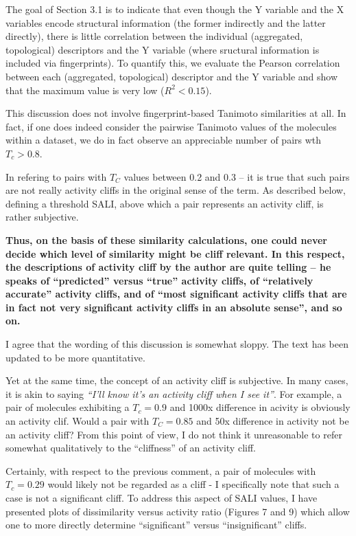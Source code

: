 \documentclass[letterpaper, 12pt]{article}
\begin{document}
The goal of Section 3.1 is to indicate that even though the Y variable and the X variables encode
structural information (the former indirectly and the latter directly), there is little correlation
between the individual (aggregated, topological) descriptors and the Y variable (where sructural
information is included via fingerprints). To quantify this, we evaluate the Pearson correlation
between each (aggregated, topological) descriptor and the Y variable and show that the maximum value
is very low ($R^2 < 0.15$).

This discussion does not involve fingerprint-based Tanimoto similarities at all. In fact, if one
does indeed consider the pairwise Tanimoto values of the molecules within a dataset, we do in fact
observe an appreciable number of pairs wth $T_c > 0.8$.

In refering to pairs with $T_C$ values between 0.2 and 0.3 -- it is true that such pairs are not
really activity cliffs in the original sense of the term. As described below, defining a threshold
SALI, above which a pair represents an activity cliff, is rather subjective. 

\textbf{Thus, on the basis of these similarity calculations, one could never decide which level of
  similarity might be cliff relevant. In this respect, the descriptions of activity cliff by the
  author are quite telling – he speaks of “predicted” versus “true” activity cliffs, of “relatively
  accurate” activity cliffs, and of “most significant activity cliffs that are in fact not very
  significant activity cliffs in an absolute sense”, and so on. }

I agree that the wording of this discussion is somewhat sloppy. The text has been updated to be more
quantitative.

Yet at the same time, the concept of an activity cliff is subjective. In many cases, it is
akin to saying \emph{``I'll know it's an activity cliff when I see it''}. For example, a pair of
molecules exhibiting a $T_c = 0.9$ and 1000x difference in acivity is obviously an activity
clif. Would a pair with $T_C = 0.85$ and 50x difference in activity not be an activity cliff? From
this point of view, I do not think it unreasonable to refer somewhat qualitatively to the
``cliffness'' of an activity cliff.

Certainly, with respect to the previous comment, a pair of molecules with $T_c = 0.29$ would likely
not be regarded as a cliff - I specifically note that such a case is not a significant cliff. To
address this aspect of SALI values, I have presented plots of dissimilarity versus activity ratio
(Figures 7 and 9) which allow one to more directly determine ``significant'' versus
``insignificant'' cliffs.
\end{document}
